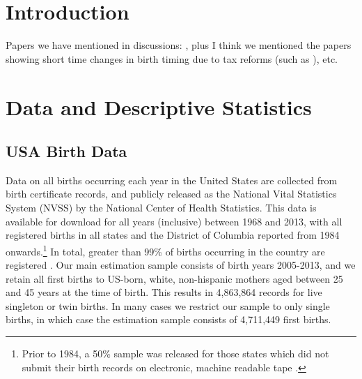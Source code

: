 \documentclass[a4paper, 11 pt]{article}
\theoremstyle{plain}
\begin{document}
\newpage
\begin{spacing}{1.4}

\section{Introduction}
Papers we have mentioned in discussions:
\citet{BucklesHungerman2013,Shigeoka2015,AlbaCaceres2014,Canchoetal2007},
plus I think we mentioned the papers showing short time changes in birth timing
due to tax reforms (such as \citet{GansLeigh2009,LaLumiaetal2015}), etc.

\section{Data and Descriptive Statistics}
\subsection{USA Birth Data}
\label{bqSscn:USAdata}
Data on all births occurring each year in the United States are collected from 
birth certificate records, and publicly released as the National Vital 
Statistics System (NVSS) by the National Center of Health Statistics. This data 
is available for download for all years (inclusive) between 1968 and 2013, with
all registered births in all states and the District of Columbia reported from 
1984 onwards.\footnote{Prior to 1984, a 50\% sample was released for those 
states which did not submit their birth records on electronic, machine readable 
tape \citep{Martinetal2015}.}  In total, greater than 99\% of births occurring 
in the country are registered \citep{Martinetal2015}. Our main estimation 
sample consists of birth years 2005-2013, and we retain all first births to 
US-born, white, non-hispanic mothers aged between 25 and 45 years at the time
of birth.  This results in 4,863,864 records for live singleton or twin births.  
In many cases we restrict our sample to only single births, in which case the 
estimation sample consists of 4,711,449 first births.


\end{spacing}
\end{document}
